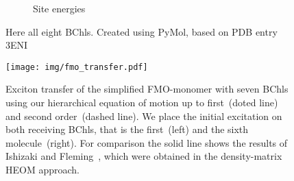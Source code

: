 \begin{figure}[t]
\begin{subfigure}[t]{.3\textwidth}
    \caption{%
      Site energies
    }
  \end{subfigure}
  \caption{%
      Here all eight BChls.
      Created using PyMol, based on PDB entry 3ENI \cite{pymol,TrCaBl09_fmo_structure}
  }
\end{figure}


\begin{figure}[p]
  \centering
  \texttt{[image: img/fmo\_transfer.pdf]}
  \caption{%
    Exciton transfer of the simplified FMO-monomer with seven BChls using our hierarchical equation of motion up to first~(doted line) and second order~(dashed line).
    We place the initial excitation on both receiving BChls, that is the first~(left) and the sixth molecule~(right).
    For comparison the solid line shows the results of Ishizaki and Fleming~\cite{IsFl09_fmo}, which were obtained in the density-matrix HEOM approach.
  }
  \label{fig:app.fmo_transfer_2}
\end{figure}

